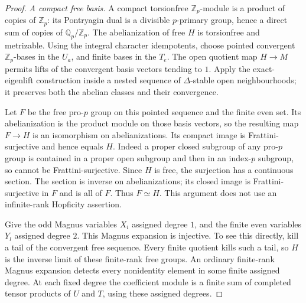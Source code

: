 \documentclass[11pt]{article}
\theoremstyle{definition}
\numberwithin{equation}{section}
\begin{document}
\begin{proof}
\emph{A compact free basis.}
A compact torsionfree $\mathbb Z_p$-module is a product of copies of
$\mathbb Z_p$: its Pontryagin dual is a divisible $p$-primary group,
hence a direct sum of copies of $\mathbb Q_p/\mathbb Z_p$.
The abelianization of free $H$ is torsionfree and metrizable.
Using the integral character idempotents, choose pointed convergent
$\mathbb Z_p$-bases in the $U_a$, and finite bases in the $T_e$.
The open quotient map $H\to M$ permits lifts of the convergent
basis vectors tending to $1$. Apply the exact-eigenlift construction
inside a nested sequence of $\Delta$-stable open neighbourhoods;
it preserves both the abelian classes and their convergence.

Let $F$ be the free pro-$p$ group on this pointed sequence and the
finite even set. Its abelianization is the product module on those
basis vectors, so the resulting map $F\to H$ is an isomorphism on
abelianizations. Its compact image is Frattini-surjective and hence
equals $H$. Indeed a proper closed subgroup of any pro-$p$ group is
contained in a proper open subgroup and then in an index-$p$ subgroup,
so cannot be Frattini-surjective. Since $H$ is free, the surjection
has a continuous section. The section is inverse on abelianizations;
its closed image is Frattini-surjective in $F$ and is all of $F$.
Thus $F\simeq H$. This argument does not use an infinite-rank
Hopficity assertion.

Give the odd Magnus variables $X_i$ assigned degree $1$, and the
finite even variables $Y_l$ assigned degree $2$. This Magnus
expansion is injective. To see this directly, kill a tail of the
convergent free sequence. Every finite quotient kills such a tail,
so $H$ is the inverse limit of these finite-rank free groups.
An ordinary finite-rank Magnus expansion detects every nonidentity
element in some finite assigned degree. At each fixed degree the
coefficient module is a finite sum of completed tensor products of
$U$ and $T$, using these assigned degrees.


\end{proof}
\end{document}
